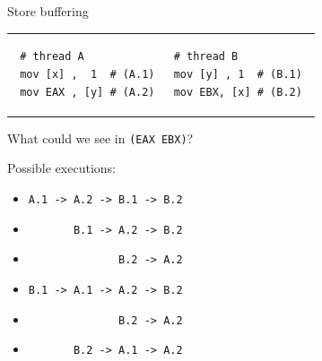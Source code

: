  \begin{frame}{Store buffering}
 
 \begin{tabular}{p{} p{}}
 \begin{verbatim}
 # thread A
 mov [x] ,  1  # (A.1)
 mov EAX , [y] # (A.2)
 \end{verbatim}
 
 & 
 
 \begin{verbatim}
 # thread B          
 mov [y] , 1  # (B.1) 
 mov EBX, [x] # (B.2) 
 \end{verbatim}
 \end{tabular}
 
 \pause

What could we see in \texttt{(EAX EBX)}?

 
 \pause
 Possible executions:
 \begin{itemize}
     \item \texttt{A.1 -> A.2 -> B.1 -> B.2}                               
     \item \texttt{\ \ \ \ \ \ \       B.1 -> A.2 -> B.2}                  
     \item \texttt{\ \ \ \ \ \ \ \ \ \ \ \ \ \              B.2 -> A.2}    
     \item \texttt{B.1 -> A.1 -> A.2 -> B.2}                               
     \item \texttt{\ \ \ \ \ \ \ \ \ \ \ \ \ \              B.2 -> A.2}    
     \item \texttt{\ \ \ \ \ \ \       B.2 -> A.1 -> A.2}                  
 \end{itemize}

\end{frame}
 


